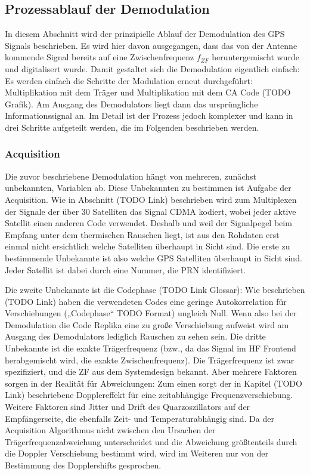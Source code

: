 \label{Grundlagen_Acquisition}

\subsection{Prozessablauf der Demodulation}
In diesem Abschnitt wird der prinzipielle Ablauf der Demodulation des GPS Signals beschrieben. Es wird hier davon ausgegangen, dass das von der Antenne kommende Signal bereits auf eine Zwischenfrequenz $f_{ZF}$ heruntergemischt wurde und digitalisert wurde. Damit gestaltet sich die Demodulation eigentlich einfach: Es werden einfach die Schritte der Modulation erneut durchgeführt: Multiplikation mit dem Träger und Multiplikation mit dem CA Code (TODO Grafik). Am Ausgang des Demodulators liegt dann das ursprüngliche Informationssignal an. Im Detail ist der Prozess jedoch komplexer und kann in drei Schritte aufgeteilt werden, die im Folgenden beschrieben werden.

\subsubsection{Acquisition}
Die zuvor beschriebene Demodulation hängt von mehreren, zunächst unbekannten, Variablen ab. Diese Unbekannten zu bestimmen ist Aufgabe der Acquisition.
Wie in Abschnitt (TODO Link) beschrieben wird zum Multiplexen der Signale der über 30 Satelliten das Signal CDMA kodiert, wobei jeder aktive Satellit einen anderen Code verwendet. Deshalb und weil der Signalpegel beim Empfang unter dem thermischen Rauschen liegt, ist aus den Rohdaten erst einmal nicht ersichtlich welche Satelliten überhaupt in Sicht sind. Die erste zu bestimmende Unbekannte ist also welche GPS Satelliten überhaupt in Sicht sind. Jeder Satellit ist dabei durch eine Nummer, die PRN identifiziert.

Die zweite Unbekannte ist die Codephase (TODO Link Glossar): Wie beschrieben (TODO Link) haben die verwendeten Codes eine geringe Autokorrelation für Verschiebungen („Codephase“ TODO Format) ungleich Null. Wenn also bei der Demodulation die Code Replika eine zu große Verschiebung aufweist wird am Ausgang des Demodulators lediglich Rauschen zu sehen sein.
Die dritte Unbekannte ist die exakte Trägerfrequenz (bzw., da das Signal im HF Frontend herabgemischt wird, die exakte Zwischenfrequenz). Die Trägerfrequenz ist zwar spezifiziert, und die ZF aus dem Systemdesign bekannt. Aber mehrere Faktoren sorgen in der Realität für Abweichungen: Zum einen sorgt der in Kapitel (TODO Link) beschriebene Dopplereffekt für eine zeitabhängige Frequenzverschiebung. Weitere Faktoren sind Jitter und Drift des Quarzoszillators auf der Empfängerseite, die ebenfalls Zeit- und Temperaturabhängig sind. Da der Acquisition Algorithmus nicht zwischen den Ursachen der Trägerfrequenzabweichung unterscheidet und die Abweichung größtenteils durch die Doppler Verschiebung bestimmt wird, wird im Weiteren nur von der Bestimmung des Dopplershifts gesprochen. 

